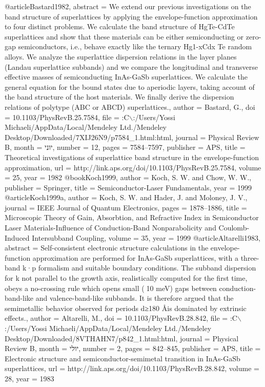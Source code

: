 @article{Bastard1982,
abstract = {We extend our previous investigations on the band structure of superlattices by applying the envelope-function approximation to four distinct problems. We calculate the band structure of HgTe-CdTe superlattices and show that these materials can be either semiconducting or zero-gap semiconductors, i.e., behave exactly like the ternary Hg1-xCdx Te random alloys. We analyze the superlattice dispersion relations in the layer planes (Landau superlattice subbands) and we compare the longitudinal and transverse effective masses of semiconducting InAs-GaSb superlattices. We calculate the general equation for the bound states due to aperiodic layers, taking account of the band structure of the host materials. We finally derive the dispersion relations of polytype (ABC or ABCD) superlattices.},
author = {Bastard, G.},
doi = {10.1103/PhysRevB.25.7584},
file = {:C$\backslash$:/Users/Yossi Michaeli/AppData/Local/Mendeley Ltd./Mendeley Desktop/Downloaded/7XIJ26N9/p7584\_1.html:html},
journal = {Physical Review B},
month = {יוני},
number = {12},
pages = {7584--7597},
publisher = {APS},
title = {{Theoretical investigations of superlattice band structure in the envelope-function approximation}},
url = {http://link.aps.org/doi/10.1103/PhysRevB.25.7584},
volume = {25},
year = {1982}
}
@book{Koch1999,
author = {Koch, S. W. and Chow, W. W.},
publisher = {Springer},
title = {{Semiconductor-Laser Fundamentals}},
year = {1999}
}
@article{Koch1999a,
author = {Koch, S. W. and Hader, J. and Moloney, J. V.},
journal = {IEEE Journal of Quantum Electronics},
pages = {1878--1886},
title = {{Microscopic Theory of Gain, Absorbtion, and Refractive Index in Semiconductor Laser Materials-Influence of Conduction-Band Nonparabolicity and Coulomb-Induced Intersubband Coupling}},
volume = {35},
year = {1999}
}
@article{Altarelli1983,
abstract = {Self-consistent electronic structure calculations in the envelope-function approximation are performed for InAs-GaSb superlattices, with a three-band k⃗·p⃗ formalism and suitable boundary conditions. The subband dispersion for k⃗ not parallel to the growth axis, realistically computed for the first time, obeys a no-crossing rule which opens small (≲10 meV) gaps between conduction-band-like and valence-band-like subbands. It is therefore argued that the semimetallic behavior observed for periods d≥180 \AA is dominated by extrinsic effects.},
author = {Altarelli, M.},
doi = {10.1103/PhysRevB.28.842},
file = {:C$\backslash$:/Users/Yossi Michaeli/AppData/Local/Mendeley Ltd./Mendeley Desktop/Downloaded/8VTHAHN7/p842\_1.html:html},
journal = {Physical Review B},
month = {יולי},
number = {2},
pages = {842--845},
publisher = {APS},
title = {{Electronic structure and semiconductor-semimetal transition in InAs-GaSb superlattices}},
url = {http://link.aps.org/doi/10.1103/PhysRevB.28.842},
volume = {28},
year = {1983}
}
